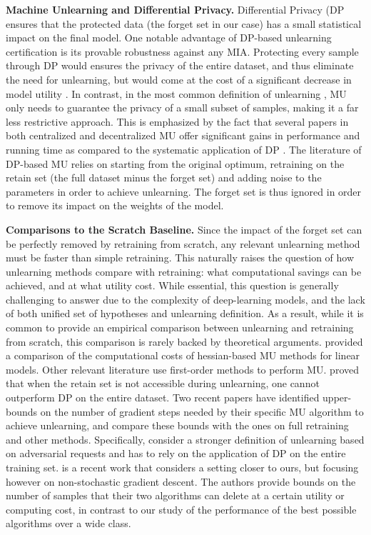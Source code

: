 \textbf{Machine Unlearning and Differential Privacy.}
 Differential Privacy (DP \cite{DP_book} ensures that the protected data (the forget set in our case) has a small statistical impact on the final model. One notable advantage of DP-based unlearning certification is its provable robustness against any MIA. 
 Protecting every sample through DP would ensures the privacy of the entire dataset, and thus eliminate the need for unlearning, but would come at the cost of a significant decrease in model utility \cite{chaudhuri2011DPERM, abadi2016deep}. In contrast, in the most common definition of unlearning \cite{ginart2019making}, MU only needs to guarantee the privacy of a small subset of samples, making it a far less restrictive approach. This is emphasized by the fact that several papers in both centralized and decentralized MU offer significant gains in performance and running time as compared to the systematic application of DP \cite{fraboni2024sifu, allouah2024utility}. The literature of DP-based MU relies on starting from the original optimum, retraining on the retain set (the full dataset minus the forget set) and adding noise to the parameters in order to achieve unlearning. The forget set is thus ignored in order to remove its impact on the weights of the model.

\textbf{Comparisons to the Scratch Baseline.}
Since the impact of the forget set can be perfectly removed by retraining from scratch, any relevant unlearning method must be faster than simple retraining.
This naturally raises the question of how unlearning methods compare with retraining: what computational savings can be achieved, and at what utility cost. While essential, this question is generally challenging to answer due to the complexity of deep-learning models, and the lack of both unified set of hypotheses and unlearning definition. As a result, while it is common to provide an empirical comparison between unlearning and retraining from scratch, this comparison is rarely backed by theoretical arguments. \citet{izzo2021approximate} provided a comparison of the computational costs of hessian-based MU methods for linear models. Other relevant literature use first-order methods to perform MU. \citet{huang2023tight} proved that when the retain set is not accessible during unlearning, one cannot outperform DP on the entire dataset. Two recent papers \cite{chourasia2023forget_unlearning, allouah2024utility} have identified upper-bounds on the number of gradient steps needed by their specific MU algorithm to achieve unlearning, and compare these bounds with the ones on full retraining and other methods. Specifically, \citet{chourasia2023forget_unlearning} consider a stronger definition of unlearning based on adversarial requests and has to rely on the application of DP on the entire training set. \cite{allouah2024utility} is a recent work that considers a setting closer to ours, but focusing however on non-stochastic gradient descent. The authors provide bounds on the number of samples that their two algorithms can delete at a certain utility or computing cost, in contrast to our study of the performance of the best possible algorithms over a wide class.